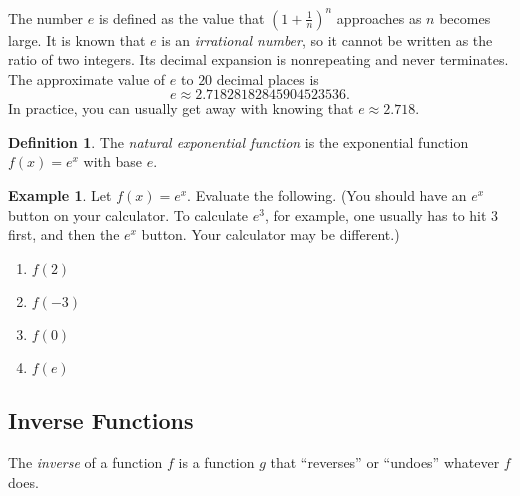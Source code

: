 \documentclass[letterpaper,12pt,oneside]{book}
\theoremstyle{definition}
\newtheorem{definition}[theorem]{Definition}
\newtheorem{example}[theorem]{Example}
\newcommand{\dsp}{\displaystyle}
\begin{document}
{\noindent
The number $e$ is defined as the value that $\dsp\left(1+\tfrac{1}{n}\right)^n$ approaches as $n$ becomes large.  It is known that $e$ is an \emph{irrational number}, so it cannot be written as the ratio of two integers.  Its decimal expansion is nonrepeating and never terminates.  The approximate value of $e$ to $20$ decimal places is
\[
e\approx 2.71828182845904523536.
\]
In practice, you can usually get away with knowing that $e\approx 2.718.$

\begin{definition}
The \emph{natural exponential function} is the exponential function $f(x)=e^x$ with base $e$.
\end{definition}

\begin{example}
Let $f(x)=e^x$.  Evaluate the following.  (You should have an $e^x$ button on your calculator.  To calculate $e^3$, for example, one usually has to hit $3$ first, and then the $e^x$ button.  Your calculator may be different.)
\begin{multicols}{2}
\begin{enumerate}
\item $f(2)$
\vspace{0.25cm}  
\item $f(-3)$
\vspace{0.25cm}  
\item $f(0)$
\vspace{0.25cm}  
\item $f(e)$
\vspace{0.25cm}  
\vspace*{\fill}
\end{enumerate}
\end{multicols}
\end{example}

\newpage

\subsection*{Inverse Functions}

\noindent
The \emph{inverse} of a function $f$ is a function $g$ that ``reverses'' or ``undoes'' whatever $f$ does. 

\begin{center}
\end{center}

}
\end{document}
